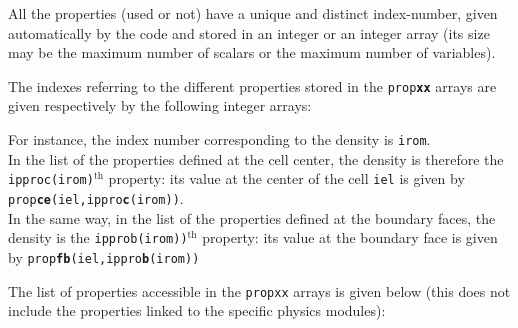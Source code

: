{{{\begin{list}{-}{}

\item All the properties (used or not) have a unique and distinct index-number,
given automatically by the code and stored in an integer or an integer array
(its size may be the maximum number of scalars
or the maximum number of variables).

\item The indexes referring  to the different properties stored in the
\texttt{prop{\bf xx}} arrays are given respectively by the following integer arrays:




\end{list}

For instance, the index number corresponding to the density is \texttt{irom}.\\
In the list of the properties defined at the cell center, the density
is therefore the \texttt{ipproc(irom)}$^{\text{th}}$
property: its value at the center of the cell \texttt{iel} is given by \texttt{prop{\bf ce}(iel,ippro{\bf c}(irom))}.\\
In the same way, in the list of the properties defined at the boundary
faces, the density is the
\texttt{ipprob(irom))}$^{\text{th}}$ property: its value at the boundary
face is given by \texttt{prop{\bf fb}(iel,ippro{\bf b}(irom))}

The list of properties accessible in the \texttt{propxx} arrays is given below (this does
not include the properties linked to the specific physics modules):



}}}
